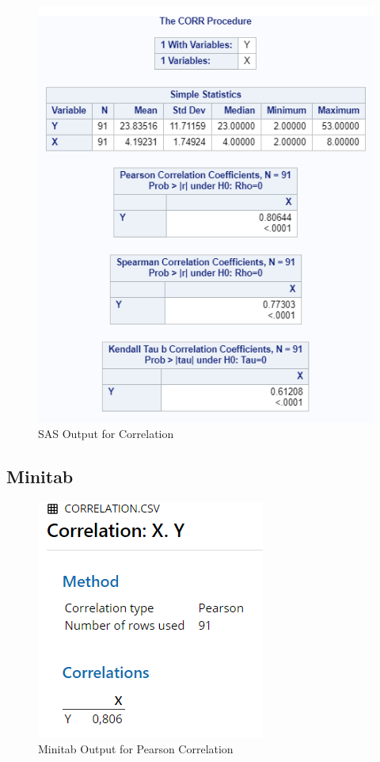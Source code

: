 \documentclass[
]{book}
\begin{document}
\begin{figure}[!h]
\includegraphics{Screenshots/Correlation/corrSAS} \caption{\label{fig:corrSAS}SAS Output for Correlation}\label{fig:corrSAS}
\end{figure}

\hypertarget{minitab}{%
\subsection{Minitab}\label{minitab}}

\begin{figure}[!h]
\includegraphics{Screenshots/Correlation/corrMinitab} \caption{\label{fig:corrMinitab}Minitab Output for Pearson Correlation}\label{fig:corrMinitab}
\end{figure}
\end{document}
